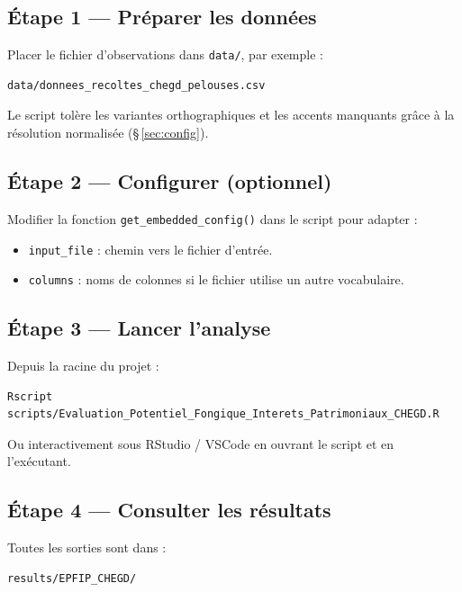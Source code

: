 \documentclass[11pt,a4paper]{article}
\begin{document}
\subsection*{Étape 1 — Préparer les données}

Placer le fichier d'observations dans \texttt{data/}, par exemple :

\begin{verbatim}
data/donnees_recoltes_chegd_pelouses.csv
\end{verbatim}

Le script tolère les variantes orthographiques et les accents manquants grâce à la résolution
normalisée (\S\,\ref{sec:config}).

\subsection*{Étape 2 — Configurer (optionnel)}

Modifier la fonction \texttt{get\_embedded\_config()} dans le script pour adapter :
\begin{itemize}
  \item \texttt{input\_file} : chemin vers le fichier d'entrée.
  \item \texttt{columns} : noms de colonnes si le fichier utilise un autre vocabulaire.
\end{itemize}

\subsection*{Étape 3 — Lancer l'analyse}

Depuis la racine du projet :

\begin{verbatim}
Rscript scripts/Evaluation_Potentiel_Fongique_Interets_Patrimoniaux_CHEGD.R
\end{verbatim}

Ou interactivement sous RStudio / VSCode en ouvrant le script et en l'exécutant.

\subsection*{Étape 4 — Consulter les résultats}

Toutes les sorties sont dans :

\begin{verbatim}
results/EPFIP_CHEGD/
\end{verbatim}

\end{document}
